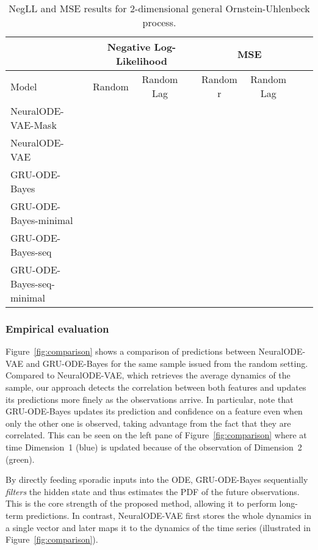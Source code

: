\documentclass{article}
\newcommand{\method}{GRU-ODE-Bayes}
\begin{document}
\begin{table*}[t]
\caption{NegLL and MSE results for 2-dimensional general Ornstein-Uhlenbeck process.}
\label{table:double_ou-lik}
\vskip 0.15in
\begin{center}
\begin{small}
\begin{sc}
\begin{tabular}{lccc|cccr}
& \multicolumn{3}{c}{Negative Log-Likelihood} & \multicolumn{3}{c}{MSE}  \\
\toprule
Model & Random  & Random Lag &   & Random r & Random Lag &  \\
\midrule
NeuralODE-VAE-Mask &  &  &    &  &  &     \\
NeuralODE-VAE &    &   &   &  &    &  \\
\hline
GRU-ODE-Bayes                 &   &  &    &  &   &    \\
GRU-ODE-Bayes-minimal                 &   &  &  &  & &     \\
GRU-ODE-Bayes-seq           &   &  &   &  &  &      \\
GRU-ODE-Bayes-seq-minimal  &   &  &  &  &   &   \\

\bottomrule
\end{tabular}
\end{sc}
\end{small}
\end{center}
\vskip -0.1in
\end{table*}

\subsubsection{Empirical evaluation}
Figure~\ref{fig:comparison} shows a comparison of predictions between NeuralODE-VAE and \method{} for the same sample issued from the random  setting. Compared to NeuralODE-VAE, which retrieves the average dynamics of the sample, our approach detects the correlation between both features and updates its predictions more finely as the observations arrive. In particular, note that \method{} updates its prediction and confidence on a feature even when only the other one is observed, taking advantage from the fact that they are correlated. This can be seen on the left pane of Figure~\ref{fig:comparison} where at time  Dimension~1 (blue) is updated because of the observation of Dimension~2 (green). 


By directly feeding sporadic inputs into the ODE, \method{} sequentially \emph{filters} the hidden state and thus estimates the PDF of the future observations. This is the core strength of the proposed method, allowing it to perform long-term predictions. 
In contrast, NeuralODE-VAE first stores the whole dynamics in a single vector and later maps it to the dynamics of the time series (illustrated in Figure~\ref{fig:comparison}).
\end{document}
